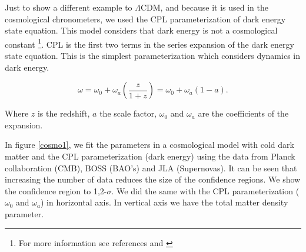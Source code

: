 \documentclass[onecolumn,           %
               showpacs,            %
               preprintnumbers,     %
               aps,                 %
               letterpaper,             %
               superscriptaddress,      %
               nofootinbib,         %
               tightenlines,        %
               floats,floatfix      %
               ,usenatbib,
               ]{revtex4-1}
\begin{document}
Just to show a different example to $\Lambda$CDM, and because it is used in the cosmological chronometers, we used the CPL parameterization of dark energy state equation. This model considers that dark energy is not a cosmological constant \footnote{For more information see references \cite{CPL1} and \cite{CPL2}}. CPL is the first two terms in the series expansion of the dark energy state equation. This is the simplest parameterization which considers dynamics in dark energy.

\begin{equation}
\omega = \omega_0 + \omega_a\left(\frac{z}{1 + z}\right) = \omega_0 + \omega_a\left(1 - a\right).
\end{equation}

Where $z$ is the redshift, $a$ the scale factor, $\omega_0$ and $\omega_a$ are the coefficients of the expansion.

In figure \ref{cosmo1}, we fit the parameters in a cosmological model with cold dark matter and the CPL parameterization (dark energy) using the data from Planck collaboration (CMB), BOSS (BAO's) and JLA (Supernovas). It can be seen that increasing the number of data reduces the size of the confidence regions. We show the confidence region to 1,2-$\sigma$. We did the same with the CPL parameterization ($\omega_0$ and  $\omega_a$) in horizontal axis. In vertical axis we have the total matter density parameter.
\end{document}
